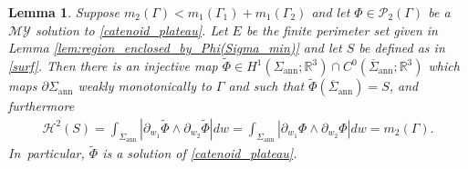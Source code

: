 \documentclass[11pt]{article}
\numberwithin{equation}{section}
\newcommand{\R}{\mathbb{R}}
\newcommand{\openannulus}{\Sigma_\mathrm{ann}}
\newtheorem{lemma}[theorem]{Lemma}
\theoremstyle{definition}
\begin{document}
\begin{lemma}\label{lem:construction-of-parametrization}
Suppose $m_2(\Gamma)<m_1(\Gamma_1)+m_1(\Gamma_2)$ and let $\Phi\in\mathcal{P}_2(\Gamma)$ be a $\mathcal{MY}$ solution to \eqref{catenoid_plateau}. Let $E$ be the finite perimeter set given in Lemma \ref{lem:region_enclosed_by_Phi(Sigma_min)} and let
$S$ be defined as in \eqref{surf}.
Then there is an injective map $\widetilde\Phi\in H^1
(\openannulus;\R^3)\cap C^0(\overline \Sigma_\mathrm{ann};\R^3)$
which maps $\partial \openannulus$
weakly monotonically to $\Gamma$ and such that $\widetilde\Phi (\overline \Sigma_\mathrm{ann}) =S$, and
furthermore
\begin{align}\label{eq:area-symmetrization}
\mathcal H^2(S)= \int_{\Sigma_{\mathrm{ann}}}|\partial_{w_1}\widetilde \Phi\wedge \partial_{w_2}\widetilde \Phi |dw=
\int_{\Sigma_{\mathrm{ann}}}|\partial_{w_1}\Phi\wedge\partial_{w_2}\Phi|dw=m_2(\Gamma).
\end{align}
In~particular, $\widetilde \Phi$ is a solution of \eqref{catenoid_plateau}.
\end{lemma}
\end{document}
